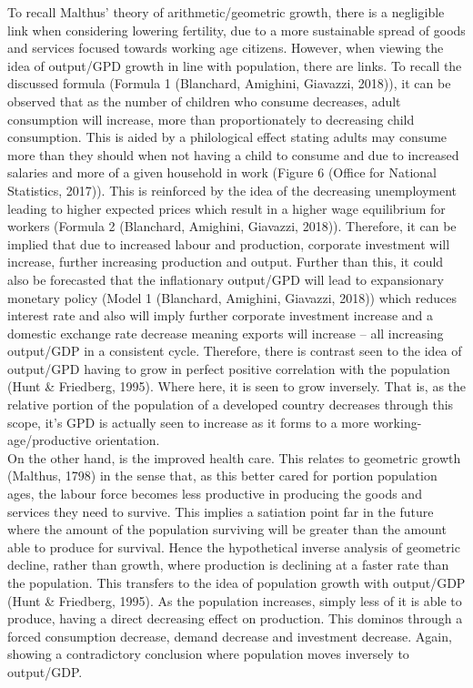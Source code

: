 \documentclass[11pt, english]{article}
\begin{document}
	To recall Malthus’ theory of arithmetic/geometric growth, there is a negligible link when considering lowering fertility, due to a more sustainable spread of goods and services focused towards working age citizens. However, when viewing the idea of output/GPD growth in line with population, there are links. To recall the discussed formula (Formula 1 (Blanchard, Amighini, Giavazzi, 2018)), it can be observed that as the number of children who consume decreases, adult consumption will increase, more than proportionately to decreasing child consumption. This is aided by a philological effect stating adults may consume more than they should when not having a child to consume and due to increased salaries and more of a given household in work (Figure 6 (Office for National Statistics, 2017)). This is reinforced by the idea of the decreasing unemployment leading to higher expected prices which result in a higher wage equilibrium for workers (Formula 2 (Blanchard, Amighini, Giavazzi, 2018)). Therefore, it can be implied that due to increased labour and production, corporate investment will increase, further increasing production and output. Further than this, it could also be forecasted that the inflationary output/GPD will lead to expansionary monetary policy (Model 1 (Blanchard, Amighini, Giavazzi, 2018)) which reduces interest rate and also will imply further corporate investment increase and a domestic exchange rate decrease meaning exports will increase – all increasing output/GDP in a consistent cycle. Therefore, there is contrast seen to the idea of output/GPD having to grow in perfect positive correlation with the population (Hunt \& Friedberg, 1995). Where here, it is seen to grow inversely. That is, as the relative portion of the population of a developed country decreases through this scope, it’s GPD is actually seen to increase as it forms to a more working-age/productive orientation.\\

	On the other hand, is the improved health care. This relates to geometric growth (Malthus, 1798) in the sense that, as this better cared for portion population ages, the labour force becomes less productive in producing the goods and services they need to survive. This implies a satiation point far in the future where the amount of the population surviving will be greater than the amount able to produce for survival. Hence the hypothetical inverse analysis of geometric decline, rather than growth, where production is declining at a faster rate than the population. This transfers to the idea of population growth with output/GDP (Hunt \& Friedberg, 1995). As the population increases, simply less of it is able to produce, having a direct decreasing effect on production. This dominos through a forced consumption decrease, demand decrease and investment decrease. Again, showing a contradictory conclusion where population moves inversely to output/GDP.\\
\end{document}
